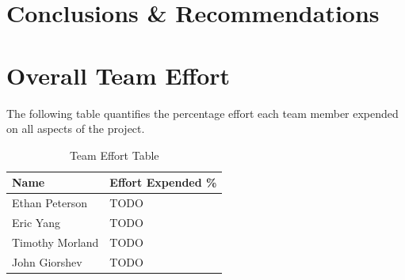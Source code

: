 \documentclass[letterpaper,11pt]{article}
\begin{document}
\section{Conclusions \& Recommendations} %

\section{Overall Team Effort}
The following table quantifies the percentage effort each team member expended
on all aspects of the project.

\begin{table}[H]
  \caption{Team Effort Table}
  \centering
  \begin{tabularx}{10cm}{l|l}
    \textbf{Name} & \textbf{Effort Expended \%}\\
    \hline
    Ethan Peterson & TODO \\
    \hline
    Eric Yang & TODO \\
    \hline
    Timothy Morland & TODO \\
    \hline
    John Giorshev & TODO \\
  \end{tabularx} 
\end{table}
\newpage




\newpage
{}

\pagestyle{empty}
\end{document}
